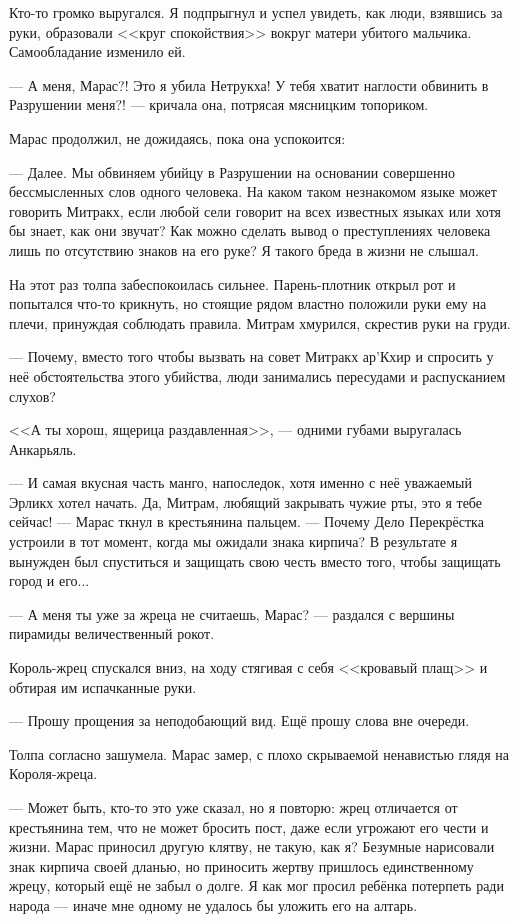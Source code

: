 Кто-то громко выругался.
Я подпрыгнул и успел увидеть, как люди, взявшись за руки, образовали <<круг спокойствия>> вокруг матери убитого мальчика.
Самообладание изменило ей.

--- А меня, Марас?!
Это я убила Нетрукха!
У тебя хватит наглости обвинить в Разрушении меня?! --- кричала она, потрясая мясницким топориком.

Марас продолжил, не дожидаясь, пока она успокоится:

--- Далее.
Мы обвиняем убийцу в Разрушении на основании совершенно бессмысленных слов одного человека.
На каком таком незнакомом языке может говорить Митракх, если любой сели говорит на всех известных языках или хотя бы знает, как они звучат?
Как можно сделать вывод о преступлениях человека лишь по отсутствию знаков на его руке?
Я такого бреда в жизни не слышал.

На этот раз толпа забеспокоилась сильнее.
Парень-плотник открыл рот и попытался что-то крикнуть, но стоящие рядом властно положили руки ему на плечи, принуждая соблюдать правила.
Митрам хмурился, скрестив руки на груди.

--- Почему, вместо того чтобы вызвать на совет Митракх ар’Кхир и спросить у неё обстоятельства этого убийства, люди занимались пересудами и распусканием слухов?

<<А ты хорош, ящерица раздавленная>>, --- одними губами выругалась Анкарьяль.

--- И самая вкусная часть манго, напоследок, хотя именно с неё уважаемый Эрликх хотел начать.
Да, Митрам, любящий закрывать чужие рты, это я тебе сейчас! --- Марас ткнул в крестьянина пальцем.
--- Почему Дело Перекрёстка устроили в тот момент, когда мы ожидали знака кирпича?
В результате я вынужден был спуститься и защищать свою честь вместо того, чтобы защищать город и его...

--- А меня ты уже за жреца не считаешь, Марас? --- раздался с вершины пирамиды величественный рокот.

Король-жрец спускался вниз, на ходу стягивая с себя <<кровавый плащ>> и обтирая им испачканные руки.

--- Прошу прощения за неподобающий вид.
Ещё прошу слова вне очереди.

Толпа согласно зашумела.
Марас замер, с плохо скрываемой ненавистью глядя на Короля-жреца.

--- Может быть, кто-то это уже сказал, но я повторю: жрец отличается от крестьянина тем, что не может бросить пост, даже если угрожают его чести и жизни.
Марас приносил другую клятву, не такую, как я?
Безумные нарисовали знак кирпича своей дланью, но приносить жертву пришлось единственному жрецу, который ещё не забыл о долге.
Я как мог просил ребёнка потерпеть ради народа --- иначе мне одному не удалось бы уложить его на алтарь.

